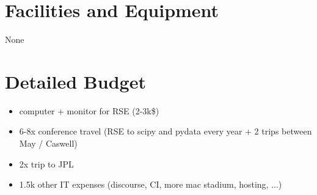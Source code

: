 \documentclass[12pt]{article}
\numberwithin{page}{section}
\begin{document}
\newpage
\section{Facilities and Equipment}
\setcounter{page}{1}

None

\newpage
\section{Detailed Budget}
\setcounter{page}{1}

\begin{itemize}
\item computer + monitor for RSE (2-3k\$)
\item 6-8x conference travel (RSE to scipy and pydata every year + 2
  trips between May / Caswell)
\item 2x trip to JPL
\item 1.5k other IT expenses (discourse, CI, more mac stadium, hosting, ...)
\end{itemize}
\end{document}
